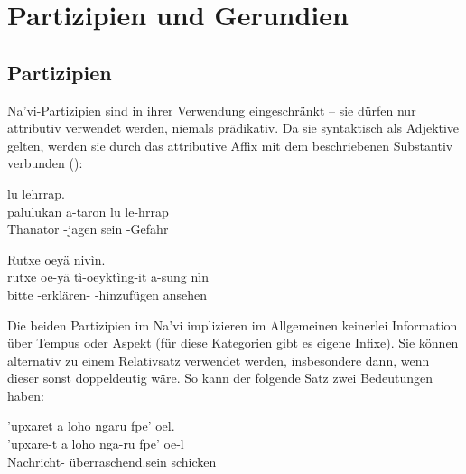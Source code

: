 \section{Partizipien und Gerundien}

\subsection{Partizipien} 
Na'vi-Partizipien sind in ihrer Verwendung eingeschränkt -- sie dürfen nur attributiv verwendet werden, niemals prädikativ. Da sie syntaktisch als Adjektive gelten, werden sie durch das attributive Affix  mit dem beschriebenen Substantiv verbunden ():\label{syn:part:attr}

\begin{interlin}
	\glll \Npawl{}  lu lehrrap. \\
	palulukan a-taron lu le-hrrap \\
	Thanator -jagen sein -Gefahr \\
\end{interlin}

\begin{interlin}
	\glll \Npawl{}Rutxe oeyä   nivìn. \\
	rutxe oe-yä tì-oeyktìng-it a-sung nìn \\
	bitte  -erklären- -hinzufügen ansehen \\
\end{interlin}

\noindent Die beiden Partizipien im Na'vi implizieren im Allgemeinen keinerlei Information über Tempus oder Aspekt (für diese Kategorien gibt es eigene Infixe). Sie können alternativ zu einem Relativsatz verwendet werden, insbesondere dann, wenn dieser sonst doppeldeutig wäre. So kann der folgende Satz zwei Bedeutungen haben: 

\begin{interlin}
	\glll 'upxaret a loho ngaru fpe' oel. \\
	'upxare-t a loho nga-ru fpe' oe-l \\
	Nachricht-  überraschend.sein  schicken  \\
\end{interlin}

